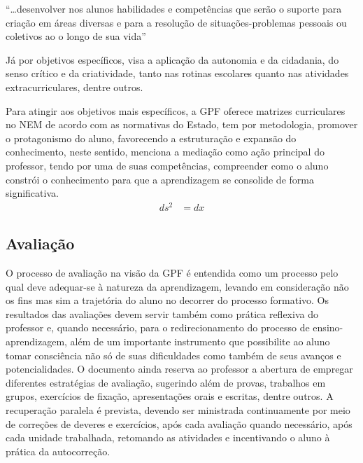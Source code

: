 \begin{citacao}
    ``\ldots desenvolver nos alunos habilidades e competências que serão o suporte para criação em áreas diversas e para a resolução de situações-problemas pessoais ou coletivos ao o longo de sua vida'' \cite[p. ~32]{GPFPPP:2021}
\end{citacao}
Já por objetivos específicos, visa a aplicação da autonomia e da cidadania, do senso crítico e da criatividade, tanto nas rotinas escolares quanto nas atividades extracurriculares, dentre outros.

Para atingir aos objetivos mais específicos, a \ac{GPF} oferece matrizes curriculares no \ac{NEM} de acordo com as normativas do Estado, tem por metodologia, promover o protagonismo do aluno, favorecendo a estruturação e expansão do conhecimento, neste sentido, menciona a mediação como ação principal do professor, tendo por uma de suas competências, compreender como o aluno constrói o conhecimento para que a aprendizagem se consolide de forma significativa.
\begin{align}
    ds^2&=dx
\end{align}
\subsection{Avaliação}
O processo de avaliação na visão da \ac{GPF} é entendida como um processo pelo qual deve adequar-se à natureza da aprendizagem, levando em consideração não os fins mas sim a trajetória do aluno no decorrer do processo formativo. Os resultados das avaliações devem servir também como prática reflexiva do professor e, quando necessário, para o redirecionamento do processo de ensino-aprendizagem, além de um importante instrumento que possibilite ao aluno tomar consciência não só de suas dificuldades como também de seus avanços e potencialidades. O documento ainda reserva ao professor a abertura de empregar diferentes estratégias de avaliação, sugerindo além de provas, trabalhos em grupos, exercícios de fixação, apresentações orais e escritas, dentre outros. A recuperação paralela é prevista, devendo ser ministrada continuamente por meio de correções de deveres e exercícios, após cada avaliação quando necessário, após cada unidade trabalhada, retomando as atividades e incentivando o aluno à prática da autocorreção.